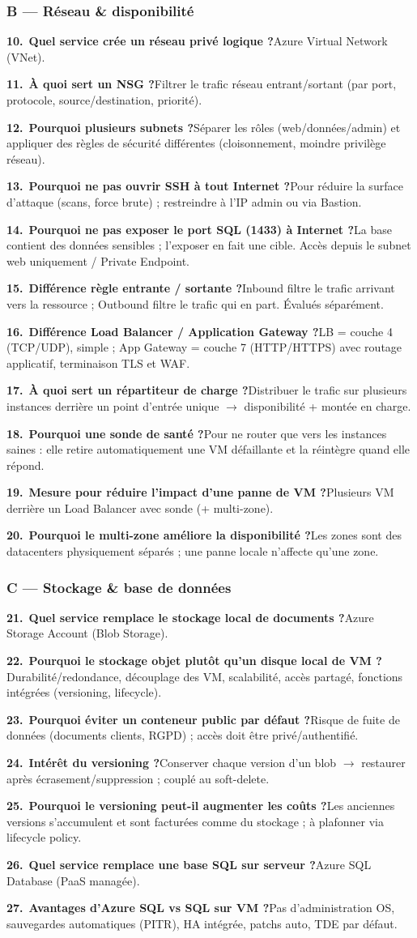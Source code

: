 \documentclass[11pt,a4paper]{article}
\newcommand{\arr}{\ensuremath{\rightarrow}}
\newcommand{\qa}[3]{\par\addvspace{1.5pt}%
  \textbf{\color{azuredark}#1.}~\textbf{#2}\quad#3\par}
\begin{document}
\subsubsection{B — Réseau \& disponibilité}
\qa{10}{Quel service crée un réseau privé logique ?}{Azure Virtual Network (VNet).}
\qa{11}{À quoi sert un NSG ?}{Filtrer le trafic réseau entrant/sortant (par port, protocole, source/destination, priorité).}
\qa{12}{Pourquoi plusieurs subnets ?}{Séparer les rôles (web/données/admin) et appliquer des règles de sécurité différentes (cloisonnement, moindre privilège réseau).}
\qa{13}{Pourquoi ne pas ouvrir SSH à tout Internet ?}{Pour réduire la surface d'attaque (scans, force brute) ; restreindre à l'IP admin ou via Bastion.}
\qa{14}{Pourquoi ne pas exposer le port SQL (1433) à Internet ?}{La base contient des données sensibles ; l'exposer en fait une cible. Accès depuis le subnet web uniquement / Private Endpoint.}
\qa{15}{Différence règle entrante / sortante ?}{Inbound filtre le trafic arrivant vers la ressource ; Outbound filtre le trafic qui en part. Évalués séparément.}
\qa{16}{Différence Load Balancer / Application Gateway ?}{LB = couche 4 (TCP/UDP), simple ; App Gateway = couche 7 (HTTP/HTTPS) avec routage applicatif, terminaison TLS et WAF.}
\qa{17}{À quoi sert un répartiteur de charge ?}{Distribuer le trafic sur plusieurs instances derrière un point d'entrée unique \arr{} disponibilité + montée en charge.}
\qa{18}{Pourquoi une sonde de santé ?}{Pour ne router que vers les instances saines : elle retire automatiquement une VM défaillante et la réintègre quand elle répond.}
\qa{19}{Mesure pour réduire l'impact d'une panne de VM ?}{Plusieurs VM derrière un Load Balancer avec sonde (+ multi-zone).}
\qa{20}{Pourquoi le multi-zone améliore la disponibilité ?}{Les zones sont des datacenters physiquement séparés ; une panne locale n'affecte qu'une zone.}

\subsubsection{C — Stockage \& base de données}
\qa{21}{Quel service remplace le stockage local de documents ?}{Azure Storage Account (Blob Storage).}
\qa{22}{Pourquoi le stockage objet plutôt qu'un disque local de VM ?}{Durabilité/redondance, découplage des VM, scalabilité, accès partagé, fonctions intégrées (versioning, lifecycle).}
\qa{23}{Pourquoi éviter un conteneur public par défaut ?}{Risque de fuite de données (documents clients, RGPD) ; accès doit être privé/authentifié.}
\qa{24}{Intérêt du versioning ?}{Conserver chaque version d'un blob \arr{} restaurer après écrasement/suppression ; couplé au soft-delete.}
\qa{25}{Pourquoi le versioning peut-il augmenter les coûts ?}{Les anciennes versions s'accumulent et sont facturées comme du stockage ; à plafonner via lifecycle policy.}
\qa{26}{Quel service remplace une base SQL sur serveur ?}{Azure SQL Database (PaaS managée).}
\qa{27}{Avantages d'Azure SQL vs SQL sur VM ?}{Pas d'administration OS, sauvegardes automatiques (PITR), HA intégrée, patchs auto, TDE par défaut.}
\end{document}
